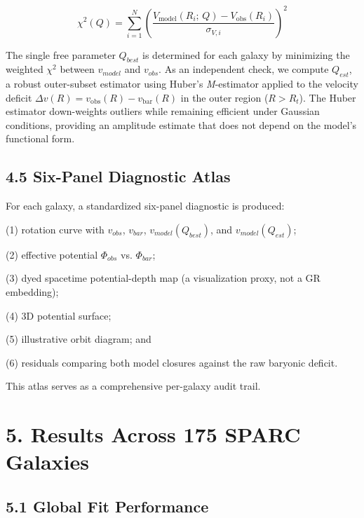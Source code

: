 \[\chi^{2}(Q) = \sum_{i = 1}^{N}\left( \frac{V_{\text{model}}\left( R_{i};\, Q \right) - V_{\text{obs}}\left( R_{i} \right)}{\sigma_{V,i}} \right)^{2}\]

The single free parameter \(Q_{best}\) is determined for each galaxy by minimizing the weighted \(\chi^{2}\) between \(v_{model}\) and \(v_{obs}\). As an independent check, we compute \(Q_{est}\), a robust outer-subset estimator using Huber's \emph{M}-estimator applied to the velocity deficit \(\Delta v(R) = v_{\text{obs}}(R) - v_{\text{bar}}(R)\) in the outer region (\(R > R_{t}\)). The Huber estimator down-weights outliers while remaining efficient under Gaussian conditions, providing an amplitude estimate that does not depend on the model's functional form.

\subsection{4.5 Six-Panel Diagnostic Atlas}\label{six-panel-diagnostic-atlas}

For each galaxy, a standardized six-panel diagnostic is produced:

(1) rotation curve with \(v_{obs}\), \(v_{bar}\), \(v_{model}\left( Q_{best} \right)\), and \(v_{model}\left( Q_{est} \right)\);

(2) effective potential \(\Phi_{obs}\) vs. \(\Phi_{bar}\);

(3) dyed spacetime potential-depth map (a visualization proxy, not a GR embedding);

(4) 3D potential surface;

(5) illustrative orbit diagram; and

(6) residuals comparing both model closures against the raw baryonic deficit.

This atlas serves as a comprehensive per-galaxy audit trail.

\section{}\label{section-6}

\section{5. Results Across 175 SPARC Galaxies}\label{results-across-175-sparc-galaxies}

\subsection{5.1 Global Fit Performance}\label{global-fit-performance}

